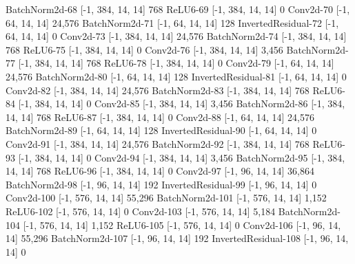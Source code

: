 \documentclass[11pt]{article}
\begin{document}
      BatchNorm2d-68          [-1, 384, 14, 14]             768
            ReLU6-69          [-1, 384, 14, 14]               0
           Conv2d-70           [-1, 64, 14, 14]          24,576
      BatchNorm2d-71           [-1, 64, 14, 14]             128
 InvertedResidual-72           [-1, 64, 14, 14]               0
           Conv2d-73          [-1, 384, 14, 14]          24,576
      BatchNorm2d-74          [-1, 384, 14, 14]             768
            ReLU6-75          [-1, 384, 14, 14]               0
           Conv2d-76          [-1, 384, 14, 14]           3,456
      BatchNorm2d-77          [-1, 384, 14, 14]             768
            ReLU6-78          [-1, 384, 14, 14]               0
           Conv2d-79           [-1, 64, 14, 14]          24,576
      BatchNorm2d-80           [-1, 64, 14, 14]             128
 InvertedResidual-81           [-1, 64, 14, 14]               0
           Conv2d-82          [-1, 384, 14, 14]          24,576
      BatchNorm2d-83          [-1, 384, 14, 14]             768
            ReLU6-84          [-1, 384, 14, 14]               0
           Conv2d-85          [-1, 384, 14, 14]           3,456
      BatchNorm2d-86          [-1, 384, 14, 14]             768
            ReLU6-87          [-1, 384, 14, 14]               0
           Conv2d-88           [-1, 64, 14, 14]          24,576
      BatchNorm2d-89           [-1, 64, 14, 14]             128
 InvertedResidual-90           [-1, 64, 14, 14]               0
           Conv2d-91          [-1, 384, 14, 14]          24,576
      BatchNorm2d-92          [-1, 384, 14, 14]             768
            ReLU6-93          [-1, 384, 14, 14]               0
           Conv2d-94          [-1, 384, 14, 14]           3,456
      BatchNorm2d-95          [-1, 384, 14, 14]             768
            ReLU6-96          [-1, 384, 14, 14]               0
           Conv2d-97           [-1, 96, 14, 14]          36,864
      BatchNorm2d-98           [-1, 96, 14, 14]             192
 InvertedResidual-99           [-1, 96, 14, 14]               0
          Conv2d-100          [-1, 576, 14, 14]          55,296
     BatchNorm2d-101          [-1, 576, 14, 14]           1,152
           ReLU6-102          [-1, 576, 14, 14]               0
          Conv2d-103          [-1, 576, 14, 14]           5,184
     BatchNorm2d-104          [-1, 576, 14, 14]           1,152
           ReLU6-105          [-1, 576, 14, 14]               0
          Conv2d-106           [-1, 96, 14, 14]          55,296
     BatchNorm2d-107           [-1, 96, 14, 14]             192
InvertedResidual-108           [-1, 96, 14, 14]               0
\end{document}
